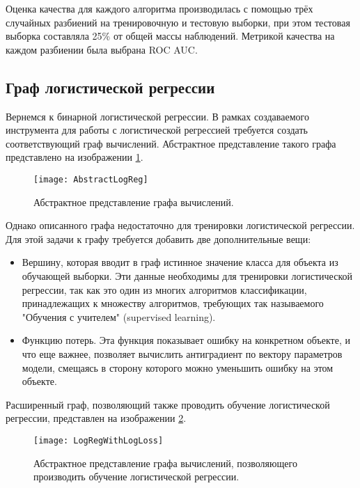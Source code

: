 Оценка качества для каждого алгоритма производилась с помощью трёх случайных разбиений на тренировочную и тестовую выборки, при этом тестовая выборка составляла 25\% от общей массы наблюдений. Метрикой качества на каждом разбиении была выбрана ROC AUC.

\subsection{Граф логистической регрессии}
Вернемся к бинарной логистической регрессии. В рамках создаваемого инструмента для работы с логистической регрессией требуется создать соответствующий граф вычислений. Абстрактное представление такого графа представлено на изображении \ref{AbstractLogReg}.

\begin{figure}[h]
    \centering
    \texttt{[image: AbstractLogReg]}
    \caption{Абстрактное представление графа вычислений.}
    \label{AbstractLogReg}
\end{figure}

Однако описанного графа недостаточно для тренировки логистической регрессии. Для этой задачи к графу требуется добавить две дополнительные вещи:

\begin{itemize}
    \item Вершину, которая вводит в граф истинное значение класса для объекта из обучающей выборки. Эти данные необходимы для тренировки логистической регрессии, так как это один из многих алгоритмов классификации, принадлежащих к множеству алгоритмов, требующих так называемого "Обучения с учителем" (supervised learning).
    \item Функцию потерь. Эта функция показывает ошибку на конкретном объекте, и что еще важнее, позволяет вычислить антиградиент по вектору параметров модели, смещаясь в сторону которого можно уменьшить ошибку на этом объекте.
\end{itemize}

Расширенный граф, позволяющий также проводить обучение логистической регрессии, представлен на изображении \ref{LogRegWithLogLoss}.

\begin{figure}[h]
    \centering
    \texttt{[image: LogRegWithLogLoss]}
    \caption{Абстрактное представление графа вычислений, позволяющего производить обучение логистической регрессии. }
    \label{LogRegWithLogLoss}
\end{figure}


